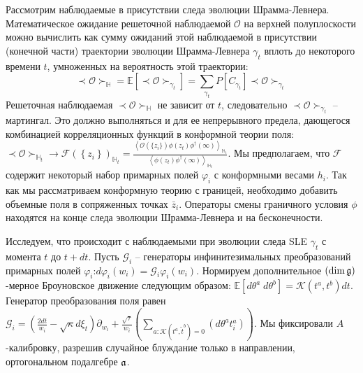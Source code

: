 \documentclass[14pt,autoref,href,facsimile
]{disser}
\begin{document}
Рассмотрим наблюдаемые в присутствии следа эволюции Шрамма-Левнера. Математическое ожидание решеточной наблюдаемой $\mathcal{O}$ на верхней полуплоскости можно вычислить как сумму ожиданий этой наблюдаемой в присутствии (конечной части) траектории эволюции Шрамма-Левнера  $\gamma_{t}$ вплоть до некоторого времени $t$, умноженных на вероятность этой траектории:
\begin{equation*}
  \prec \mathcal{O} \succ_{\mathbb{H}}=\mathbb{E}\left[\prec\mathcal{O}\succ_{\gamma_{t}}\right]=\sum_{\gamma_{t}} P\left[C_{\gamma_{t}}\right] \prec \mathcal{O} \succ_{\gamma_{t}}
\end{equation*}
Решеточная наблюдаемая  $\prec \mathcal{O} \succ_{\mathbb{H}}$ не зависит от  $t$, следовательно $\prec\mathcal{O}\succ_{\gamma_{t}}$ -- мартингал. Это должно выполняться и для ее непрерывного предела, дающегося комбинацией корреляционных функций в конформной теории поля:
$
  \prec \mathcal{O} \succ_{\mathbb{H}_{t}}\to \mathcal{F}(\left\{z_{i}\right\})_{\mathbb{H}_{t}}=
  \frac{\left< \mathcal{O}(\{z_{i}\})\phi(z_{t})\phi^{\dagger}(\infty)\right>_{\mathbb{H}_{t}}}{\left<\phi(z_{t})\phi^{\dagger}(\infty)\right>_{\mathbb{H}_{t}}}.
$
Мы предполагаем, что $\mathcal{F}$ содержит некоторый набор примарных полей  $\varphi_{i}$ с конформными весами $h_{i}$. Так как мы рассматриваем конформную теорию с границей, необходимо добавить объемные поля в сопряженных точках  $\bar z_{i}$.  Операторы смены граничного условия   $\phi$ находятся на конце следа эволюции Шрамма-Левнера и на бесконечности.

Исследуем, что происходит с наблюдаемыми при эволюции следа SLE $\gamma_{t}$ с момента   $t$ до $t+ dt$. 
Пусть  $\mathcal{G}_{i}$ --  генераторы инфинитезимальных преобразований примарных полей $\varphi_{i}$:$d\varphi_{i}(w_{i}) = \mathcal{G}_{i}\varphi_{i}(w_{i})$. Нормируем дополнительное $\left(\dim\mathfrak{g}\right)$-мерное Броуновское движение следующим образом: $\mathbb  {E}\left[d\theta^{a}\; d\theta^{b}\right]=\mathcal{K}(t^{a},t^{b})dt$. Генератор преобразования поля равен
$
  \mathcal{G}_{i}=\left(\frac{2dt}{w_{i}}-\sqrt{\kappa} d\xi_{t}\right) \partial_{w_{i}}+\frac{\sqrt{\tau}}{w_{i}}\left(\sum_{a:\mathcal{K}(t^{a},\tilde{t}^{b})=0}\left(d \theta ^{a} t^{a}_{i}\right)\right).
$ Мы фиксировали  $A$-калибровку, разрешив случайное блуждание только в направлении, ортогональном подалгебре $\mathfrak{a}$. 
\end{document}
